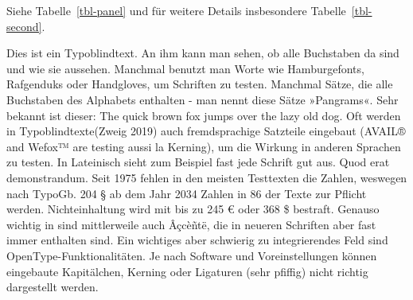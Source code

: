 \documentclass[
  letterpaper,
  DIV=11]{scrartcl}
\begin{document}
Siehe Tabelle~\ref{tbl-panel} und für weitere Details insbesondere
Tabelle~\ref{tbl-second}.

Dies ist ein Typoblindtext. An ihm kann man sehen, ob alle Buchstaben da
sind und wie sie aussehen. Manchmal benutzt man Worte wie Hamburgefonts,
Rafgenduks oder Handgloves, um Schriften zu testen. Manchmal Sätze, die
alle Buchstaben des Alphabets enthalten - man nennt diese Sätze
»Pangrams«. Sehr bekannt ist dieser: The quick brown fox jumps over the
lazy old dog. Oft werden in Typoblindtexte(Zweig 2019) auch
fremdsprachige Satzteile eingebaut (AVAIL® and Wefox™ are testing aussi
la Kerning), um die Wirkung in anderen Sprachen zu testen. In Lateinisch
sieht zum Beispiel fast jede Schrift gut aus. Quod erat demonstrandum.
Seit 1975 fehlen in den meisten Testtexten die Zahlen, weswegen nach
TypoGb. 204 § ab dem Jahr 2034 Zahlen in 86 der Texte zur Pflicht
werden. Nichteinhaltung wird mit bis zu 245 € oder 368 \$ bestraft.
Genauso wichtig in sind mittlerweile auch Âçcèñtë, die in neueren
Schriften aber fast immer enthalten sind. Ein wichtiges aber schwierig
zu integrierendes Feld sind OpenType-Funktionalitäten. Je nach Software
und Voreinstellungen können eingebaute Kapitälchen, Kerning oder
Ligaturen (sehr pfiffig) nicht richtig dargestellt werden.

\begin{table}

\caption{\label{tbl-panel}Enorm wichtige Daten.}

\begin{minipage}{0.50\linewidth}



\end{minipage}%
%
\begin{minipage}{0.50\linewidth}



\end{minipage}%

\end{table}%
\end{document}
